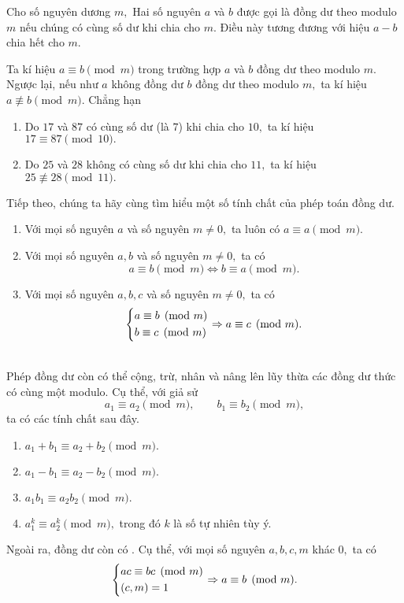 \begin{dx}
Cho số nguyên dương $m,$ Hai số nguyên $a$ và $b$ được gọi là đồng dư theo modulo $m$ nếu chúng có cùng số dư khi chia cho $m.$ Điều này tương đương với hiệu $a-b$ chia hết cho $m.$
\end{dx}
Ta kí hiệu $a\equiv b\pmod{m}$ trong trường hợp $a$ và $b$ đồng dư theo modulo $m$. Ngược lại, nếu như $a$ không đồng dư $b$ đồng dư theo modulo $m,$ ta kí hiệu $a\not\equiv b\pmod{m}.$ Chẳng hạn
\begin{enumerate}
    \item Do $17$ và $87$ có cùng số dư (là $7$) khi chia cho $10,$ ta kí hiệu $17\equiv 87\pmod{10}.$
    \item Do $25$ và $28$ không có cùng số dư khi chia cho $11,$ ta kí hiệu $25\not\equiv 28\pmod{11}.$
\end{enumerate}
Tiếp theo, chúng ta hãy cùng tìm hiểu một số tính chất của phép toán đồng dư.
\begin{light}
\begin{enumerate}
    \item {} Với mọi số nguyên $a$ và số nguyên $m\ne 0,$ ta luôn có $a\equiv a\pmod{m}.$
    \item {} Với mọi số nguyên $a,b$ và số nguyên $m\ne 0,$ ta có
    $$a\equiv b\pmod{m}\Leftrightarrow b\equiv a\pmod{m}.$$
    \item {} Với mọi số nguyên $a,b,c$ và số nguyên $m\ne 0,$ ta có
    $$\left\{\begin{aligned}&a\equiv b\pmod{m} \\ &b\equiv c\pmod{m}\end{aligned}\right.\Rightarrow a\equiv c\pmod{m}.$$
\end{enumerate}
\\
Phép đồng dư còn có thể cộng, trừ, nhân và nâng lên lũy thừa các đồng dư thức có cùng một modulo. Cụ thể, với giả sử
$$a_1\equiv a_2\pmod{m},\qquad b_1\equiv b_2\pmod{m},$$
ta có các tính chất sau đây.
\begin{enumerate}
    \item $a_{1}+b_{1} \equiv a_{2}+b_{2} \pmod{m}.$
    \item $a_{1}-b_{1} \equiv a_{2}-b_{2} \pmod{m}.$
    \item $a_{1}b_{1} \equiv a_{2}b_{2} \pmod{m}.$
    \item $a_{1}^k \equiv a_{2}^k \pmod{m},$ trong đó $k$ là số tự nhiên tùy ý.
\end{enumerate}
Ngoài ra, đồng dư còn có . Cụ thể, với mọi số nguyên $a,b,c,m$ khác $0,$ ta có
$$\left\{\begin{aligned}&ac\equiv bc\pmod{m}\\&(c,m)=1\end{aligned}\right.\Rightarrow a\equiv b\pmod{m}.$$
\end{light}

